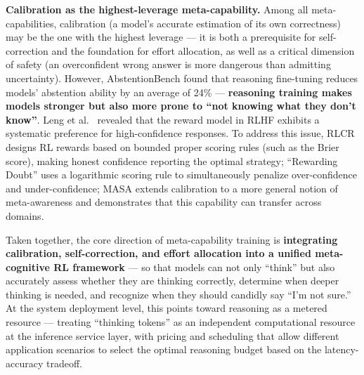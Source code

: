 \noindent
\textbf{Calibration as the highest-leverage meta-capability.}
Among all meta-capabilities, calibration (a model's accurate estimation of its own correctness)
may be the one with the highest leverage ---
it is both a prerequisite for self-correction and the foundation for effort allocation,
as well as a critical dimension of safety (an overconfident wrong answer is more dangerous than admitting uncertainty).
However, AbstentionBench \cite{abstentionbench2025} found that
reasoning fine-tuning reduces models' abstention ability by an average of 24\% ---
\textbf{reasoning training makes models stronger but also more prone to ``not knowing what they don't know''}.
Leng et al.\ \cite{leng2024tamingoverconfidence}
revealed that the reward model in RLHF exhibits a systematic preference for high-confidence responses.
To address this issue,
RLCR \cite{damani2025rlcr} designs RL rewards based on bounded proper scoring rules (such as the Brier score),
making honest confidence reporting the optimal strategy;
``Rewarding Doubt'' \cite{stangel2025rewardingdoubt}
uses a logarithmic scoring rule to simultaneously penalize over-confidence and under-confidence;
MASA \cite{masa2025} extends calibration to a more general notion of meta-awareness
and demonstrates that this capability can transfer across domains.

\noindent
Taken together, the core direction of meta-capability training is
\textbf{integrating calibration, self-correction, and effort allocation
into a unified meta-cognitive RL framework} ---
so that models can not only ``think'' but also accurately assess whether they are thinking correctly,
determine when deeper thinking is needed,
and recognize when they should candidly say ``I'm not sure.''
At the system deployment level, this points toward
reasoning as a metered resource ---
treating ``thinking tokens'' as an independent computational resource at the inference service layer,
with pricing and scheduling that allow different application scenarios to select the optimal reasoning budget
based on the latency-accuracy tradeoff.

